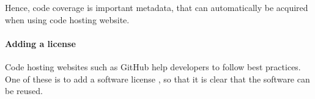 Hence, code coverage is important metadata, that can automatically
be acquired when using code hosting website.

\paragraph{Adding a license}

Code hosting websites such as GitHub help developers to follow
best practices. One of these is to add a software license \cite{jimenez2017four},
so that it is clear that the software can be reused.

